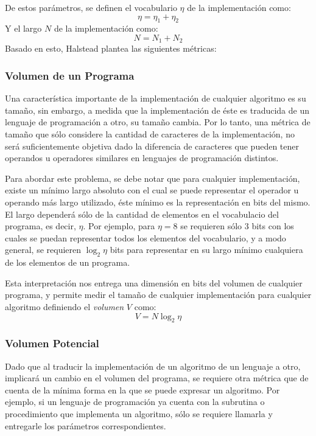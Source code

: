 \documentclass[letterpaper,12pt]{article}
\begin{document}
De estos parámetros, se definen el vocabulario $\eta$ de la implementación como:
\begin{equation*}
  \eta = \eta_{1} + \eta_{2}
\end{equation*}
Y el largo $N$ de la implementación como:
\begin{equation*}
  N = N_{1} + N_{2}
\end{equation*}
Basado en esto, Halstead plantea las siguientes métricas:

\subsubsection{Volumen de un Programa}

Una característica importante de la implementación de cualquier algoritmo es su tamaño, sin embargo, a medida que la implementación de éste es traducida de un lenguaje de programación a otro, su tamaño cambia. Por lo tanto, una métrica de tamaño que sólo considere la cantidad de caracteres de la implementación, no será suficientemente objetiva dado la diferencia de caracteres que pueden tener operandos u operadores similares en lenguajes de programación distintos.

Para abordar este problema, se debe notar que para cualquier implementación, existe un mínimo largo absoluto con el cual se puede representar el operador u operando más largo utilizado, éste mínimo es la representación en bits del mismo. El largo dependerá sólo de la cantidad de elementos en el vocabulacio del programa, es decir, $\eta$. Por ejemplo, para $\eta = 8$ se requieren sólo 3 bits con los cuales se puedan representar todos los elementos del vocabulario, y a modo general, se requieren $\log_{2}\eta$ bits para representar en su largo mínimo cualquiera de los elementos de un programa.

Esta interpretación nos entrega una dimensión en bits del volumen de cualquier programa, y permite medir el tamaño de cualquier implementación para cualquier algoritmo definiendo el \textit{volumen} $V$ como:
\begin{equation}
  V = N\log_{2}\eta
\end{equation}
\subsubsection{Volumen Potencial}

Dado que al traducir la implementación de un algoritmo de un lenguaje a otro, implicará un cambio en el volumen del programa, se requiere otra métrica que de cuenta de la mínima forma en la que se puede expresar un algoritmo. Por ejemplo, si un lenguaje de programación ya cuenta con la subrutina o procedimiento que implementa un algoritmo, sólo se requiere llamarla y entregarle los parámetros correspondientes.
\end{document}
